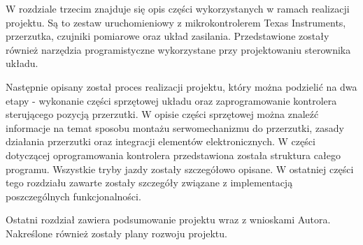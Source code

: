 W rozdziale trzecim znajduje się opis części wykorzystanych w ramach realizacji projektu. Są to zestaw uruchomieniowy z mikrokontrolerem Texas Instruments, przerzutka, czujniki pomiarowe oraz układ zasilania. Przedstawione zostały również narzędzia programistyczne wykorzystane przy projektowaniu sterownika układu. 

Następnie opisany został proces realizacji projektu, który można podzielić na dwa etapy - wykonanie części sprzętowej układu oraz zaprogramowanie kontrolera sterującego pozycją przerzutki. W opisie części sprzętowej można znaleźć informacje na temat sposobu montażu serwomechanizmu do przerzutki, zasady działania przerzutki oraz integracji elementów elektronicznych. W części dotyczącej oprogramowania kontrolera przedstawiona została struktura całego programu. Wszystkie tryby jazdy zostały szczegółowo opisane. W ostatniej części tego rozdziału zawarte zostały szczegóły związane z implementacją poszczególnych funkcjonalności.

Ostatni rozdział zawiera podsumowanie projektu wraz z wnioskami Autora. Nakreślone również zostały plany rozwoju projektu.